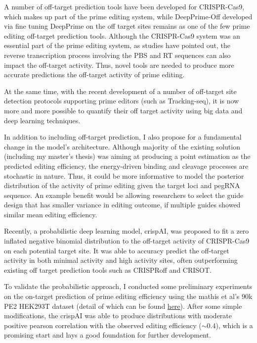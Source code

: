 \documentclass[a4,12pt]{article}
\begin{document}
A number of off-target prediction tools have been developed for CRISPR-Cas9, which makes up part of the prime editing system, while DeepPrime-Off developed via fine tuning DeepPrime on the off target sites remains as one of the few prime editing off-target prediction tools. Although the CRISPR-Cas9 system was an essential part of the prime editing system, as studies have pointed out, the reverse transcription process involving the PBS and RT sequences can also impact the off-target activity. Thus, novel tools are needed to produce more accurate predictions the off-target activity of prime editing\parencite{liangGenomewideProfilingPrime2023,yuPredictionEfficienciesDiverse2023}.

At the same time, with the recent development of a number of off-target site detection protocols supporting prime editors (such as Tracking-seq), it is now more and more possible to quantify their off target activity using big data and deep learning techniques\parencite{liangGenomewideProfilingPrime2023,
zhuTrackingseqRevealsHeterogeneity2024}.

In addition to including off-target prediction, I also propose for a fundamental change in the model's architecture. Although majority of the existing solution (including my master's thesis) was aiming at producing a point estimation as the predicted editing efficiency\parencite{mathisMachineLearningPrediction2024,yuPredictionEfficienciesDiverse2023,koeppelPredictionPrimeEditing2023}, the energy-driven binding and cleavage processes are stochastic in nature\cite{stortzPiCRISPRPhysicallyInformed2023}. Thus, it could be more informative to model the posterior distribution of the activity of prime editing given the target loci and pegRNA sequence. An example benefit would be allowing researchers to select the guide design that has smaller variance in editing outcome, if multiple guides showed similar mean editing efficiency.

Recently, a probabilistic deep learning model, crispAI, was proposed to fit a zero inflated negative binomial distribution to the off-target activity of CRISPR-Cas9 on each potential target site\parencite{ozdenLearningQuantifyUncertainty2024}. It was able to accuracy predict the off-target activity in both minimal activity and high activity sites, often outperforming existing off target prediction tools such as CRISPRoff and CRISOT.

To validate the probabilistic approach, I conducted some preliminary experiments on the on-target prediction of prime editing efficiency using the mathis et al's 90k PE2 HEK293T dataset (detail of which can be found \href{https://github.com/PeihengLu/PEOff/blob/main/txt/preliminary/preliminary.pdf}{here})\parencite{mathisPredictingPrimeEditing2023}. After some simple modifications, the crispAI was able to produce distributions with moderate positive pearson correlation with the observed editing efficiency ($\sim 0.4$), which is a promising start and lays a good foundation for further development.
\end{document}
